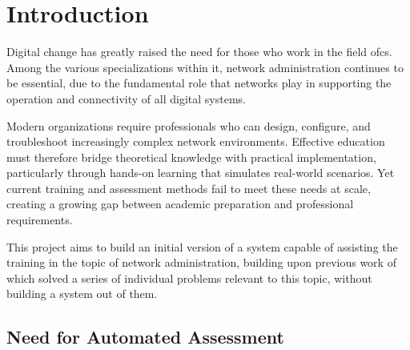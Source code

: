 
\chapter{Introduction}


\label{Chapter1Introduction}


Digital change has greatly raised the need for those who work in the field of\ac{cs}. Among the various specializations within it, network 
administration continues to be essential, due to the fundamental role that networks play in supporting the operation and connectivity 
of all digital systems.

Modern organizations require professionals who can design, configure, and troubleshoot increasingly complex network environments. 
Effective education must therefore bridge theoretical knowledge with practical implementation, particularly through hands-on learning 
that simulates real-world scenarios. Yet current training and assessment methods fail to meet these needs at scale, creating a growing gap 
between academic preparation and professional requirements.

This project aims to build an initial version of a system capable of assisting the training in the topic of network administration, building upon previous 
work of \citet{santos2024} which solved a series of individual problems relevant to this topic, without building a system out of them.

\section{Need for Automated Assessment}

